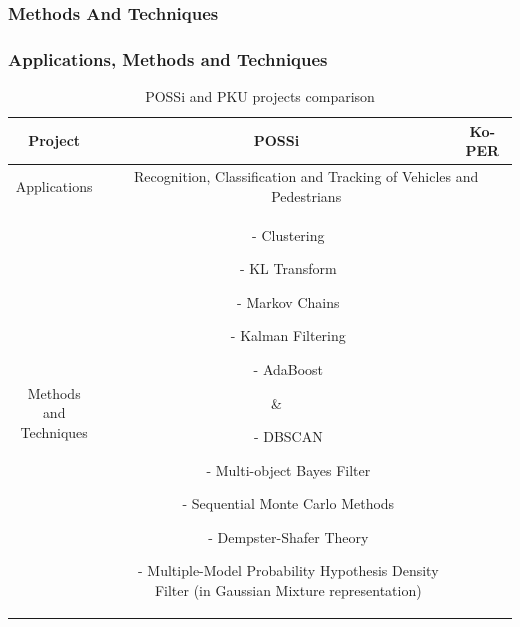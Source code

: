 \documentclass[table]{beamer}
\begin{document}
\subsubsection*{Methods And Techniques}
\frame
{
	\frametitle{Applications, Methods and Techniques}
	
	\scriptsize{
	\begin{table}	
	\begin{tabular}{|c|c|c|}
	\hline
	Project & POSSi & Ko-PER \\
	\hline
	Applications & \multicolumn{2}{c|}{\parbox{6cm}{Recognition, Classification and Tracking of Vehicles and Pedestrians}} \\
	\hline
	\parbox{2.5cm}{Methods and \\Techniques}
	& \parbox{2.5cm}{\begin{itemize}[leftmargin=.07in]
		\item[-] Clustering
		\item[-] KL Transform
		\item[-] Markov Chains
		\item[-] Kalman Filtering
		\item[-] AdaBoost
	\end{itemize}
	}
	& \parbox{3.5cm}{
	\begin{itemize}[leftmargin=.07in]
		\item[-] DBSCAN
		\item[-] Multi-object Bayes Filter
		\item[-] Sequential Monte Carlo Methods
		\item[-] Dempster-Shafer Theory
		\item[-] Multiple-Model Probability Hypothesis Density Filter (in Gaussian Mixture representation)
	\end{itemize}
	}\\
	\hline
	
	\end{tabular}
	\caption{POSSi and PKU projects comparison}	
	\end{table}
	}
}
\end{document}
